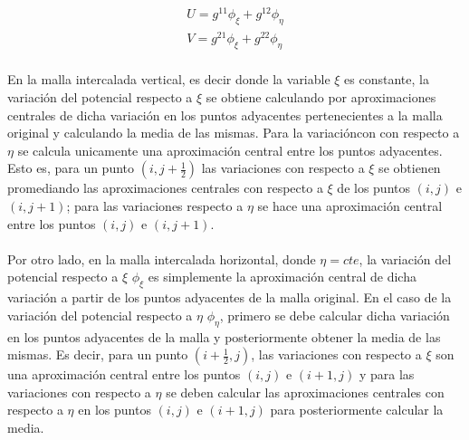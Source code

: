 \documentclass[letterpaper, openright, 12pt]{book}
\begin{document}
        \begin{align*}
            U = g^{11} \phi_{\xi} + g^{12} \phi_{\eta}
            \\
            V = g^{21} \phi_{\xi} + g^{22} \phi_{\eta}
        \end{align*}

    \paragraph*{}
        En la malla intercalada vertical, es decir donde la variable $\xi$ es
        constante, la variación del potencial respecto a $\xi$ se obtiene
        calculando por aproximaciones centrales de dicha variación en los puntos
        adyacentes pertenecientes a la malla original y calculando la media de
        las mismas. Para la variacióncon con respecto a $\eta$ se calcula
        unicamente una aproximación central entre los puntos adyacentes. Esto
        es, para un punto $(i, j + \frac{1}{2})$ las variaciones con respecto a
        $\xi$ se obtienen promediando las aproximaciones centrales con respecto
        a $\xi$ de los puntos $(i, j)$ e $(i, j+1)$; para las variaciones
        respecto a $\eta$ se hace una aproximación central entre los puntos
        $(i, j)$ e $(i, j+1)$.

    \paragraph*{}
        Por otro lado, en la malla intercalada horizontal, donde $\eta=cte$,
        la variación del potencial respecto a $\xi$ $\phi_\xi$ es simplemente
        la aproximación central de dicha variación a partir de los puntos
        adyacentes de la malla original. En el caso de la variación del
        potencial respecto a $\eta$ $\phi_\eta$, primero se debe calcular dicha
        variación en los puntos adyacentes de la malla y posteriormente obtener
        la media de las mismas. Es decir, para un punto $(i + \frac{1}{2}, j)$,
        las variaciones con respecto a $\xi$ son una aproximación central entre
        los puntos $(i, j)$ e $(i + 1, j)$ y para las variaciones con respecto
        a $\eta$ se deben calcular las aproximaciones centrales con respecto a
        $\eta$ en los puntos $(i, j)$ e $(i + 1, j)$ para posteriormente
        calcular la media.
\end{document}
